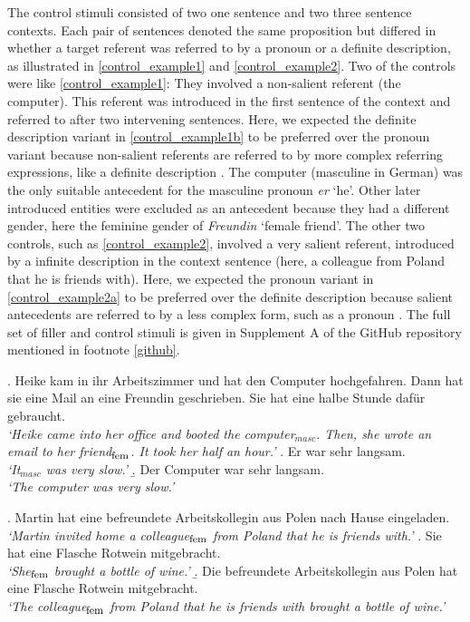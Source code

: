 \documentclass{salt}
\begin{document}
The control stimuli consisted of two one sentence and two three sentence contexts. Each pair of sentences denoted the same proposition but differed in whether a target referent was referred to by a pronoun or a definite description, as illustrated in \ref{control_example1} and \ref{control_example2}. Two of the controls were like \ref{control_example1}: They involved a non-salient referent (the computer). This referent was introduced in the first sentence of the context and referred to after two intervening sentences. Here, we expected the definite description variant in \ref{control_example1b} to be preferred over the pronoun variant because non-salient referents are referred to by more complex referring expressions, like a definite description \cite[see][]{gundel_et_al_1993}. The computer (masculine in German) was the only suitable antecedent for the masculine pronoun \textit{er} `he'. Other later introduced entities were excluded as an antecedent because they had a different gender, here the feminine gender of \textit{Freundin} `female friend'. The other two controls, such as \ref{control_example2}, involved a very salient referent, introduced by a infinite description in the context sentence (here, a colleague from Poland that he is friends with). Here, we expected the pronoun variant in \ref{control_example2a} to be preferred over the definite description because salient antecedents are referred to by a less complex form, such as a pronoun \cite[see][]{gundel_et_al_1993}.  The full set of filler and control stimuli is given in Supplement A of the GitHub repository mentioned in footnote \ref{github}.

\ex.\label{control_example1} Heike kam in ihr Arbeitszimmer und hat den Computer hochgefahren. Dann hat sie eine Mail an eine Freundin geschrieben. Sie hat eine halbe Stunde dafür gebraucht.\\
\textit{`Heike came into her office and booted the computer$_{masc}$. Then, she wrote an email to her friend$_{\mbox{\footnotesize fem}}$. It took her half an hour.'}
\a. Er war sehr langsam.\\
\textit{`It$_{masc}$ was very slow.'}
\b.\label{control_example1b} Der Computer war sehr langsam.\\
\textit{`The computer was very slow.'}


\ex.\label{control_example2} Martin hat eine befreundete Arbeitskollegin aus Polen nach Hause eingeladen.\\
\textit{`Martin invited home a colleague$_{\mbox{\footnotesize fem}}$ from Poland that he is friends with.'}
\a.\label{control_example2a} Sie hat eine Flasche Rotwein mitgebracht.\\
\textit{`She$_{\mbox{\footnotesize fem}}$ brought a bottle of wine.'}
\b. Die befreundete Arbeitskollegin aus Polen hat eine Flasche Rotwein mitgebracht.\\
\textit{`The colleague$_{\mbox{\footnotesize fem}}$ from Poland that he is friends with brought a bottle of wine.'}
\end{document}
